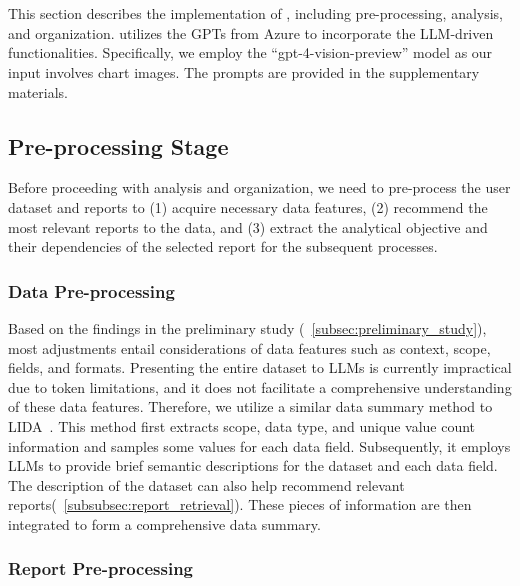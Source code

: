 \section{\system{}}
\label{sec:respark}

This section describes the implementation of \system{}, including pre-processing, analysis, and organization. 
\system{} utilizes the GPTs from Azure to incorporate the LLM-driven functionalities. 
Specifically, we employ the ``gpt-4-vision-preview'' model as our input involves chart images. 
The prompts are provided in the supplementary materials. 

\subsection{Pre-processing Stage}

Before proceeding with analysis and organization, we need to pre-process the user dataset and reports to (1) acquire necessary data features, (2) recommend the most relevant reports to the data, and (3) extract the analytical objective and their dependencies of the selected report for the subsequent processes. 

\subsubsection{Data Pre-processing}
\label{subsubsec:data_pre_processing}

Based on the findings in the preliminary study (~\autoref{subsec:preliminary_study}), most adjustments entail considerations of data features such as context, scope, fields, and formats. 
Presenting the entire dataset to LLMs is currently impractical due to token limitations, and it does not facilitate a comprehensive understanding of these data features. 
Therefore, we utilize a similar data summary method to LIDA~\cite{dibia2023lida}. 
This method first extracts scope, data type, and unique value count information and samples some values for each data field. 
Subsequently, it employs LLMs to provide brief semantic descriptions for the dataset and each data field. 
The description of the dataset can also help recommend relevant reports(~\autoref{subsubsec:report_retrieval}). 
These pieces of information are then integrated to form a comprehensive data summary.

\subsubsection{Report Pre-processing}
\label{subsubsec:report_pre_processing}

